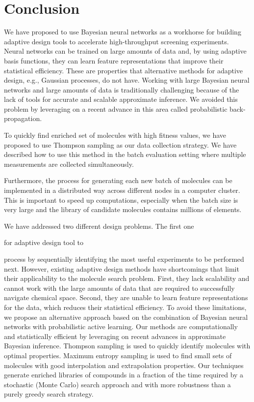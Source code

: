 \section{Conclusion}

We have proposed to use Bayesian neural networks as a workhorse for building adaptive design tools to accelerate high-throughput screening experiments. Neural networks can be trained on large amounts of data and, by using adaptive basis functions, they can learn feature representations that improve their statistical efficiency. These are properties that alternative methods for adaptive design, e.g., Gaussian processes, do not have. Working with large Bayesian neural networks and large amounts of data is traditionally challenging because of the lack of tools for accurate and scalable approximate inference. We avoided this problem by leveraging on a recent advance in this area called probabilistic back-propagation.

To quickly find enriched set of molecules with high fitness values, we have proposed to use Thompson sampling as our data collection strategy. We have described how to use this method in the batch evaluation setting where multiple measurements are collected simultaneously. 

Furthermore, the process for generating each new batch of molecules can be implemented in a distributed way across different nodes in a computer cluster. This is important to speed up computations, especially when the batch size is very large and the library of candidate molecules contains millions of elements. 

We have addressed two different design problems. The first one

for adaptive design tool to


process by sequentially identifying the most useful experiments to be performed
next. However, existing adaptive design methods have shortcomings that limit
their applicability to the molecule search problem. First, they lack
scalability and cannot work with the large amounts of data that are required to
successfully navigate chemical space. Second, they are unable to learn feature
representations for the data, which reduces their statistical efficiency. To
avoid these limitations, we propose an alternative approach based on the
combination of Bayesian neural networks with probabilistic active learning. Our
methods are computationally and statistically efficient by leveraging on recent
advances in approximate Bayesian inference. Thompson
sampling is used to quickly identify molecules with optimal properties.
Maximum entropy sampling is used
to find small sets of molecules with good interpolation and extrapolation properties.
Our techniques generate enriched libraries of compounds in a fraction
of the time required by a stochastic (Monte Carlo) search approach and with
more robustness than a purely greedy search strategy.

